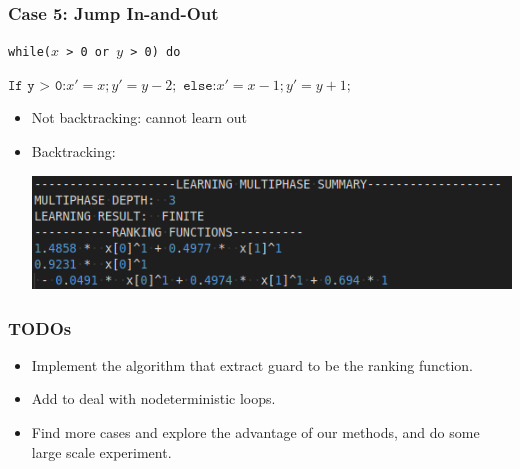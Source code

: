 \documentclass[10pt]{beamer}
\begin{document}
\begin{frame}\frametitle{Case 5: Jump In-and-Out}
\begin{example}
\texttt{while($x$ > 0 or $y$ > 0) do }

$\texttt{If y > 0:} x' = x; y' = y - 2;$
$\texttt{else:} x' = x - 1; y' = y + 1;$

\end{example}
\begin{itemize}
\item Not backtracking: cannot learn out

\item Backtracking:
\begin{center}
\includegraphics[scale=0.5]{6.png}
\end{center}
\end{itemize}
\end{frame}


\begin{frame}\frametitle{TODOs}
\begin{itemize}

\item Implement the algorithm that extract guard to be the ranking function.

\item Add to deal with nodeterministic loops.

\item Find more cases and explore the advantage of our methods, and do some large scale experiment.
\end{itemize}
\end{frame}
\end{document}
